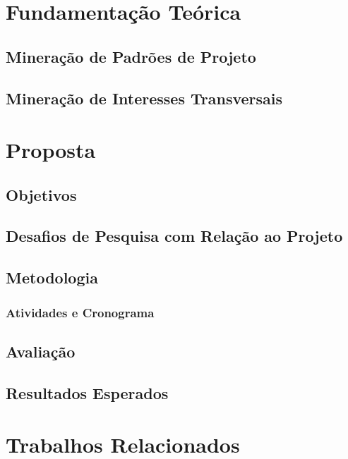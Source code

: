 \documentclass[a4paper,12pt]{article}
\begin{document}
       

\section{Fundamentação Teórica}\label{sec:fundamentacao}


\subsection{Mineração de Padrões de Projeto}\label{sub:mineracao}


 
\subsection{Mineração de Interesses Transversais}\label{sub:mineracao}


\section{Proposta}\label{sec:proposta}



\subsection{Objetivos}\label{sec:Objetivos}


\subsection{Desafios de Pesquisa com Relação ao Projeto}\label{desafios}

\subsection{Metodologia}\label{sec:metodologia}

   
\subsubsection{Atividades e Cronograma}\label{sec:atividadeECronograma}


\subsection{Avaliação}\label{sec:avaliacao}

\subsection{Resultados Esperados}\label{sec:ResultadosEsperados}

\section{Trabalhos Relacionados}\label{sec:relacionados}
 
     

\singlespacing 


\end{document}
